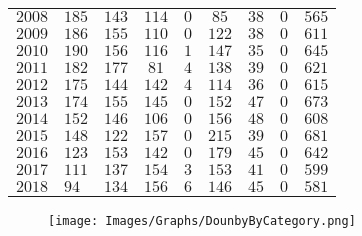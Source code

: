 \begin{longtable}{|l|p{1.1cm}ccccccc|}
    $2008$  & $185$ & $143$ & $114$ & $0$   & $85$  & $38$  & $0$   & $565$ \\
    $2009$  & $186$ & $155$ & $110$ & $0$   & $122$ & $38$  & $0$   & $611$ \\
    $2010$  & $190$ & $156$ & $116$ & $1$   & $147$ & $35$  & $0$   & $645$ \\
    $2011$  & $182$ & $177$ & $81$  & $4$   & $138$ & $39$  & $0$   & $621$ \\
    $2012$  & $175$ & $144$ & $142$ & $4$   & $114$ & $36$  & $0$   & $615$ \\
    $2013$  & $174$ & $155$ & $145$ & $0$   & $152$ & $47$  & $0$   & $673$ \\
    $2014$  & $152$ & $146$ & $106$ & $0$   & $156$ & $48$  & $0$   & $608$ \\
    $2015$  & $148$ & $122$ & $157$ & $0$   & $215$ & $39$  & $0$   & $681$ \\
    $2016$  & $123$ & $153$ & $142$ & $0$   & $179$ & $45$  & $0$   & $642$ \\
    $2017$  & $111$ & $137$ & $154$ & $3$   & $153$ & $41$  & $0$   & $599$ \\
    $2018$  & $94$  & $134$ & $156$ & $6$   & $146$ & $45$  & $0$   & $581$
\hline
\end{longtable}

\begin{landscape}
\begin{figure}[H]
\centering
\texttt{[image: Images/Graphs/DounbyByCategory.png]}
\end{figure}
\end{landscape}
